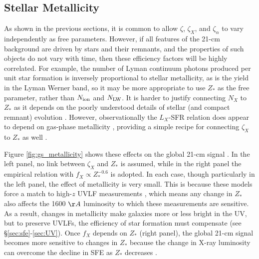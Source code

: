 \subsection{Stellar Metallicity}
As shown in the previous sections, it is common to allow $\zeta$, $\zeta_X$, and $\zeta_{\alpha}$ to vary independently as free parameters. However, if all features of the 21-cm background are driven by stars and their remnants, and the properties of such objects do not vary with time, then these efficiency factors will be highly correlated. For example, the number of Lyman continuum photons produced per unit star formation is inversely proportional to stellar metallicity, as is the yield in the Lyman Werner band, so it may be more appropriate to use $Z_{\ast}$ as the free parameter, rather than $N_{\text{ion}}$ and $N_{\text{LW}}$. It is harder to justify connecting $N_X$ to $Z_{\ast}$ as it depends on the poorly understood details of stellar (and compact remnant) evolution \cite{Belcynski2010}. However, observationally the $L_X$-SFR relation does appear to depend on gas-phase metallicity \cite{Brorby2016}, providing a simple recipe for connecting $\zeta_X$ to $Z_{\ast}$ as well \cite{Mirocha2017}.

Figure \ref{fig:gs_metallicity} shows these effects on the global 21-cm signal \cite{Mirocha2017}. In the left panel, no link between $\zeta_X$ and $Z_{\ast}$ is assumed, while in the right panel the empirical relation with $f_X \propto Z_{\ast}^{-0.6}$ is adopted. In each case, though particularly in the left panel, the effect of metallicity is very small. This is because these models force a match to high-$z$ UVLF measurements \cite{Bouwens2015,Finkelstein2015}, which means any change in $Z_{\ast}$ also affects the 1600 $\AA$ luminosity to which these measurements are sensitive. As a result, changes in metallicity make galaxies more or less bright in the UV, but to preserve UVLFs, the efficiency of star formation must compensate (see \S\ref{sec:sfe}-\ref{sec:UV}). Once $f_X$ depends on $Z_{\ast}$ (right panel), the global 21-cm signal becomes more sensitive to changes in $Z_{\ast}$ because the change in X-ray luminosity can overcome the decline in SFE as $Z_{\ast}$ decreases \cite{Mirocha2017}.

